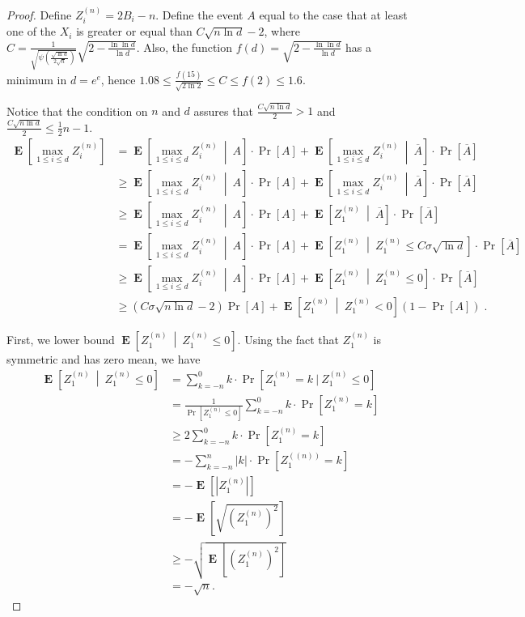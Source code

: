 \documentclass{article}
\DeclareMathOperator*{\Exp}{\mathbf{E}}
\begin{document}
\begin{proof}
Define $Z^{(n)}_i = 2 B_i-n$.  Define the event $A$ equal to the case that at least
one of the $X_i$ is greater or equal than $C \sqrt{n \ln d}-2$, where
$C=\frac{1}{\sqrt{\psi\left(\frac{\sqrt{\ln d}}{2
\sqrt{n}}\right)}}\sqrt{2-\frac{\ln \ln d}{\ln d}}$. Also, the function
$f(d)=\sqrt{2-\frac{\ln \ln d}{\ln d}}$ has a minimum in $d=e^e$, hence
$1.08 \le \frac{f(15)}{\sqrt{2 \ln 2}} \le C\le f(2)\le 1.6$.

Notice that the condition on $n$ and $d$ assures that $\frac{C \sqrt{n \ln d}}{2}>1$ and $\frac{C \sqrt{n \ln d}}{2}\le \frac{1}{2} n - 1$.
\begin{align*}
\Exp \left[ \max_{1 \le i \le d} Z^{(n)}_i \right]
& = \Exp \left[ \max_{1 \le i \le d} Z^{(n)}_i ~ \middle|~ A \right] \cdot \Pr[A] + \Exp \left[ \max_{1 \le i \le d} Z^{(n)}_i ~\middle|~ \overline{A} \right] \cdot \Pr \left[ \overline{A} \right] \\
& \ge \Exp \left[ \max_{1 \le i \le d} Z^{(n)}_i ~\middle|~ A \right] \cdot \Pr[A] + \Exp \left[ \max_{1 \le i \le d} Z^{(n)}_i ~\middle|~ \overline{A} \right] \cdot \Pr \left[ \overline{A} \right]\\
& \ge \Exp \left[ \max_{1 \le i \le d} Z^{(n)}_i ~\middle|~ A \right] \cdot \Pr[A] + \Exp\left[ Z^{(n)}_1 ~\middle|~ \overline{A} \right] \cdot \Pr \left[ \overline{A} \right] \\
& = \Exp \left[ \max_{1 \le i \le d} Z^{(n)}_i ~\middle|~ A \right] \cdot \Pr[A] + \Exp \left[ Z^{(n)}_1 ~\middle|~ Z^{(n)}_1 \le C \sigma \sqrt{\ln d} \right] \cdot \Pr \left[ \overline{A} \right]\\
& \ge \Exp \left[ \max_{1 \le i \le d} Z^{(n)}_i ~\middle|~ A \right] \cdot \Pr[A] + \Exp \left[ Z^{(n)}_1 ~\middle|~ Z^{(n)}_1 \le 0 \right] \cdot \Pr \left[ \overline{A} \right] \\
& \ge (C \sigma \sqrt{n \ln d} - 2) \Pr[A] + \Exp \left[ Z^{(n)}_1 ~\middle|~ Z^{(n)}_1 < 0 \right] (1 - \Pr[A]) \; .
\end{align*}

First, we lower bound $\Exp \left[ Z^{(n)}_1 ~\middle|~ Z^{(n)}_1 \le 0 \right]$. Using the fact that $Z^{(n)}_1$ is symmetric and has zero mean, we have
\begin{align*}
\Exp \left[ Z^{(n)}_1 ~\middle|~ Z^{(n)}_1 \le 0 \right]
& = \sum_{k=-n}^0 k \cdot \Pr[Z^{(n)}_1 = k ~|~ Z^{(n)}_1 \le 0] \\
& = \frac{1}{\Pr[Z^{(n)}_1 \le 0]} \sum_{k=-n}^0 k \cdot \Pr[Z^{(n)}_1 = k] \\
& \ge 2 \sum_{k=-n}^0 k \cdot \Pr[Z^{(n)}_1 = k] \\
& = - \sum_{k=-n}^n |k| \cdot \Pr[Z^((n))_1 = k] \\
& = - \Exp[|Z^{(n)}_1|] \\
& = - \Exp \left[ \sqrt{ \left( Z^{(n)}_1 \right)^2} \right] \\
& \ge - \sqrt{\Exp \left[ \left( Z^{(n)}_1 \right)^2 \right]} \\
& = -\sqrt{n}.
\end{align*}


\end{proof}
\end{document}
